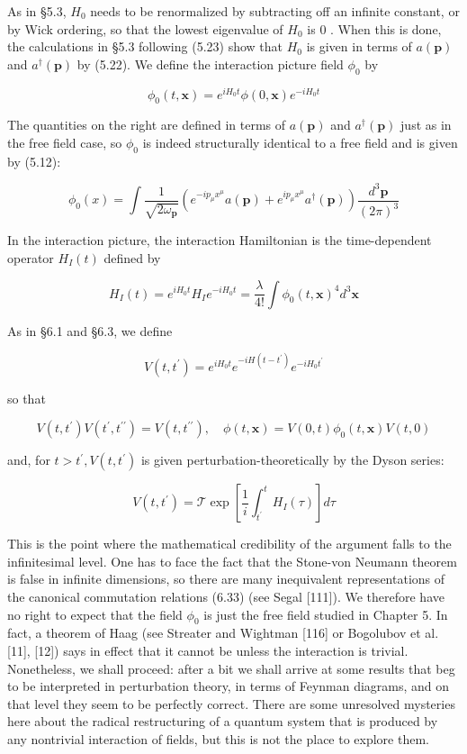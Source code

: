 \documentclass[10pt, letterpaper]{article}
\begin{document}
As in §5.3, $H_{0}$ needs to be renormalized by subtracting off an infinite constant, or by Wick ordering, so that the lowest eigenvalue of $H_{0}$ is 0 . When this is done, the calculations in §5.3 following (5.23) show that $H_{0}$ is given in terms of $a(\mathbf{p})$ and $a^{\dagger}(\mathbf{p})$ by (5.22). We define the interaction picture field $\phi_{0}$ by

$$
\phi_{0}(t, \mathbf{x})=e^{i H_{0} t} \phi(0, \mathbf{x}) e^{-i H_{0} t}
$$

The quantities on the right are defined in terms of $a(\mathbf{p})$ and $a^{\dagger}(\mathbf{p})$ just as in the free field case, so $\phi_{0}$ is indeed structurally identical to a free field and is given by (5.12):

$$
\phi_{0}(x)=\int \frac{1}{\sqrt{2 \omega_{\mathbf{p}}}}\left(e^{-i p_{\mu} x^{\mu}} a(\mathbf{p})+e^{i p_{\mu} x^{\mu}} a^{\dagger}(\mathbf{p})\right) \frac{d^{3} \mathbf{p}}{(2 \pi)^{3}}
$$

In the interaction picture, the interaction Hamiltonian is the time-dependent operator $H_{I}(t)$ defined by

$$
H_{I}(t)=e^{i H_{0} t} H_{I} e^{-i H_{0} t}=\frac{\lambda}{4!} \int \phi_{0}(t, \mathbf{x})^{4} d^{3} \mathbf{x}
$$

As in §6.1 and §6.3, we define

$$
V\left(t, t^{\prime}\right)=e^{i H_{0} t} e^{-i H\left(t-t^{\prime}\right)} e^{-i H_{0} t^{\prime}}
$$

so that

$$
V\left(t, t^{\prime}\right) V\left(t^{\prime}, t^{\prime \prime}\right)=V\left(t, t^{\prime \prime}\right), \quad \phi(t, \mathbf{x})=V(0, t) \phi_{0}(t, \mathbf{x}) V(t, 0)
$$

and, for $t>t^{\prime}, V\left(t, t^{\prime}\right)$ is given perturbation-theoretically by the Dyson series:

$$
V\left(t, t^{\prime}\right)=\mathcal{T} \exp \left[\frac{1}{i} \int_{t^{\prime}}^{t} H_{I}(\tau)\right] d \tau
$$

This is the point where the mathematical credibility of the argument falls to the infinitesimal level. One has to face the fact that the Stone-von Neumann theorem is false in infinite dimensions, so there are many inequivalent representations of the canonical commutation relations (6.33) (see Segal [111]). We therefore have no right to expect that the field $\phi_{0}$ is just the free field studied in Chapter 5. In fact, a theorem of Haag (see Streater and Wightman [116] or Bogolubov et al. [11], [12]) says in effect that it cannot be unless the interaction is trivial. Nonetheless, we shall proceed: after a bit we shall arrive at some results that beg to be interpreted in perturbation theory, in terms of Feynman diagrams, and on that level they seem to be perfectly correct. There are some unresolved mysteries here about the radical restructuring of a quantum system that is produced by any nontrivial interaction of fields, but this is not the place to explore them.
\end{document}
